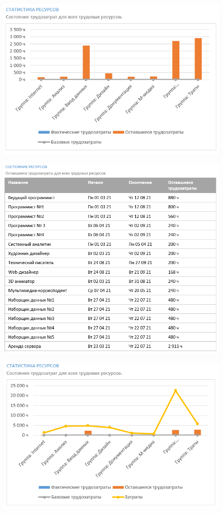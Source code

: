\begin{figure}[H]
	\centering
	\includegraphics[width=0.7\linewidth]{src/task3_1}
	\caption{}
	\label{fig:task31}
\end{figure}
\begin{figure}[H]
	\centering
	\includegraphics[width=0.7\linewidth]{src/task3_2}
	\caption{}
	\label{fig:task32}
\end{figure}
\begin{figure}[H]
	\centering
	\includegraphics[width=0.7\linewidth]{src/task3_3}
	\caption{}
	\label{fig:task33}
\end{figure}
